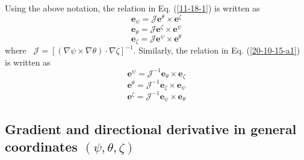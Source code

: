 \documentclass{llncs}
\begin{document}
Using the above notation, the relation in Eq. (\ref{11-18-1}) is written as
\begin{equation}
  \mathbf{e}_{\psi} = \mathcal{J} \mathbf{e}^{\theta} \times
  \mathbf{e}^{\zeta}
\end{equation}
\begin{equation}
  \mathbf{e}_{\theta} = \mathcal{J} \mathbf{e}^{\zeta} \times
  \mathbf{e}^{\psi}
\end{equation}
\begin{equation}
  \mathbf{e}_{\zeta} = \mathcal{J} \mathbf{e}^{\psi} \times
  \mathbf{e}^{\theta}
\end{equation}
where \ $\mathcal{J} = [(\nabla \psi \times \nabla \theta) \cdot \nabla
\zeta]^{- 1}$. Similarly, the relation in Eq. (\ref{20-10-15-a1}) is written
as
\begin{equation}
  \mathbf{e}^{\psi} = \mathcal{J}^{- 1} \mathbf{e}_{\theta} \times
  \mathbf{e}_{\zeta}
\end{equation}
\begin{equation}
  \mathbf{e}^{\theta} = \mathcal{J}^{- 1} \mathbf{e}_{\zeta} \times
  \mathbf{e}_{\psi}
\end{equation}
\begin{equation}
  \mathbf{e}^{\zeta} = \mathcal{J}^{- 1} \mathbf{e}_{\psi} \times
  \mathbf{e}_{\theta}
\end{equation}

\subsection{Gradient and directional derivative in general coordinates $(\psi,
\theta, \zeta)$}
\end{document}
